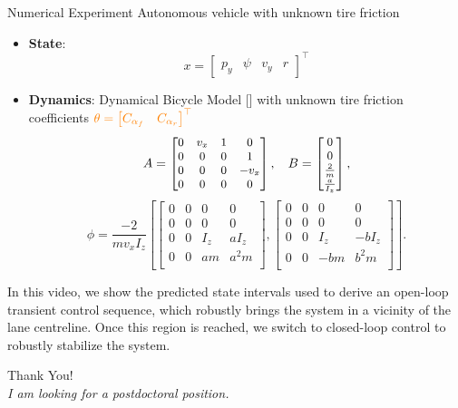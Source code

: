 \documentclass[slideopt,A4,showboxes,svgnames]{beamer}
\begin{document}
\begin{frame}{Numerical Experiment}
Autonomous vehicle with {\orange unknown tire friction}
\begin{itemize}
	\item \textbf{State}: $$x = \begin{bmatrix} {p_y} & {\psi} & {v_y} & {r} \end{bmatrix}^\top $$
	\item \textbf{Dynamics}: Dynamical Bicycle Model [\cite{awan2014compensation}] with unknown tire friction coefficients ${\color{orange} \theta = \begin{bmatrix} C_{\alpha_f} & C_{\alpha_r}\end{bmatrix}^\top}$
	\[
	\small
	A = \begin{bmatrix}
	0 & v_x & 1 & 0 \\
	0 & 0 & 0 & 1 \\
	0 & 0 & 0 & - v_x \\
	0 & 0 & 0 & 0
	\end{bmatrix},\quad
	B =
	\begin{bmatrix}
	0 \\
	0 \\
	\frac{2}{m} \\
	\frac{a}{I_z}
	\end{bmatrix},
	\]
	\[
	\phi = \frac{-2}{m v_x I_z}\left[\begin{bmatrix}
	0 & 0 & 0 & 0 \\
	0 & 0 & 0 & 0 \\
	0 & 0 & I_z & a I_z \\
	0 & 0 & a m & a^2 m \\
	\end{bmatrix},\begin{bmatrix}
	0 & 0 & 0 & 0 \\
	0 & 0 & 0 & 0 \\
	0 & 0 & I_z & -b I_z \\
	0 & 0 & - bm & b^2 m \\
	\end{bmatrix}\right].
	\]
\end{itemize}

\end{frame}

\begin{frame}
In this video, we show the predicted state intervals used to derive an open-loop transient control sequence, which robustly brings the system in a vicinity of the lane centreline. Once this region is reached, we switch to closed-loop control to robustly stabilize the system.
\end{frame}

\begin{frame}
\centering \LARGE Thank You!\\[1cm]
\large \emph{I am looking for a postdoctoral position.}
\end{frame}
\end{document}
